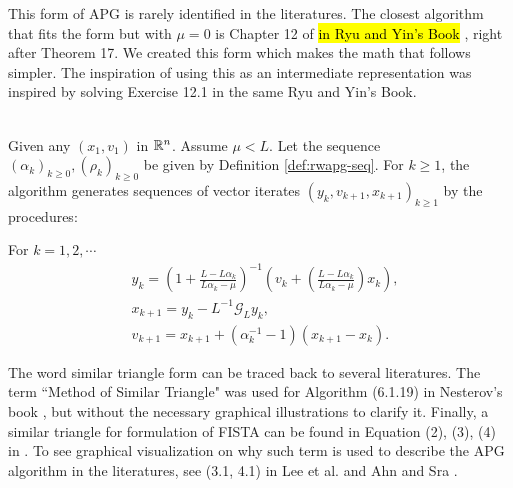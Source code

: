 \documentclass[12pt]{article}
\begin{document}
        \begin{remark}
            This form of APG is rarely identified in the literatures. 
            The closest algorithm that fits the form but with $\mu = 0$ is Chapter 12 of 
            {\hl{in Ryu and Yin's Book} \cite{ryu_large-scale_2022}}, 
            right after Theorem 17. 
            We created this form which makes the math that follows simpler. 
            The inspiration of using this as an intermediate representation was inspired by solving Exercise 12.1 in the same Ryu and Yin's Book. 
        \end{remark}
        \begin{definition}\label{def:r-wapg-st-form} \; \\
            Given any $(x_1, v_1)$ in $\mathbb R^n$. 
            Assume $\mu < L$.
            Let the sequence $(\alpha_k)_{k \ge 0}, (\rho_k)_{k\ge 0}$ be given by Definition \ref{def:rwapg-seq}. 
            For $k \ge 1$, the algorithm generates sequences of vector iterates $(y_k, v_{k + 1}, x_{k + 1})_{k \ge 1}$ by the procedures: 
            \begin{tcolorbox}
                For $k=1, 2, \cdots $
                \begin{align*}
                    & y_k = 
                    \left(
                        1 + \frac{L - L\alpha_k}{L\alpha_k - \mu}
                    \right)^{-1}
                    \left(
                        v_k + 
                        \left(\frac{L - L\alpha_k}{L\alpha_k - \mu} \right) x_k
                    \right), 
                    \\
                    & x_{k + 1} = 
                    y_k - L^{-1} \mathcal G_L y_k, 
                    \\
                    & v_{k + 1} = 
                    x_{k + 1} + (\alpha_k^{-1} -1)(x_{k + 1} - x_k). 
                \end{align*}    
            \end{tcolorbox}
        \end{definition}
        \begin{remark}
            The word similar triangle form can be traced back to several literatures. 
            The term ``Method of Similar Triangle" was used for Algorithm (6.1.19) in Nesterov's book \cite{nesterov_lectures_2018}, but without the necessary graphical illustrations to clarify it. 
            Finally, a similar triangle for formulation of FISTA can be found in Equation (2), (3), (4) in 
            \cite{chambolle_convergence_2015}. 
            To see graphical visualization on why such term is used to describe the APG algorithm in the literatures, see 
            {(3.1, 4.1) in Lee et al. \cite{lee_geometric_2021} and Ahn and Sra \cite{ahn_understanding_2022}}. 
        \end{remark}
\end{document}
